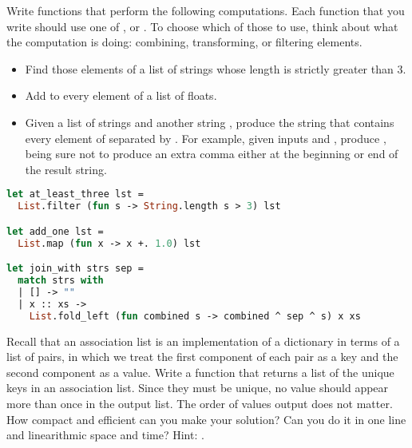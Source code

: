 Write functions that perform the following computations. Each function that you write should use one of ,  or . To choose which of those to use, think about what the computation is doing: combining, transforming, or filtering elements.
\begin{itemize}
  \item Find those elements of a list of strings whose length is strictly greater than 3.
  \item Add  to every element of a list of floats.
  \item Given a list of strings  and another string , produce the string that contains every element of  separated by . For example, given inputs \code{["hi";"bye"]} and , produce , being sure not to produce an extra comma either at the beginning or end of the result string.
\end{itemize}

\begin{lstlisting}[language=OCaml]
let at_least_three lst =
  List.filter (fun s -> String.length s > 3) lst

let add_one lst =
  List.map (fun x -> x +. 1.0) lst

let join_with strs sep =
  match strs with
  | [] -> ""
  | x :: xs ->
    List.fold_left (fun combined s -> combined ^ sep ^ s) x xs
\end{lstlisting}

Recall that an association list is an implementation of a dictionary in terms of a list of pairs, in which we treat the first component of each pair as a key and the second component as a value.
Write a function  that returns a list of the unique keys in an association list. Since they must be unique, no value should appear more than once in the output list. The order of values output does not matter. How compact and efficient can you make your solution? Can you do it in one line and linearithmic space and time? Hint: .

